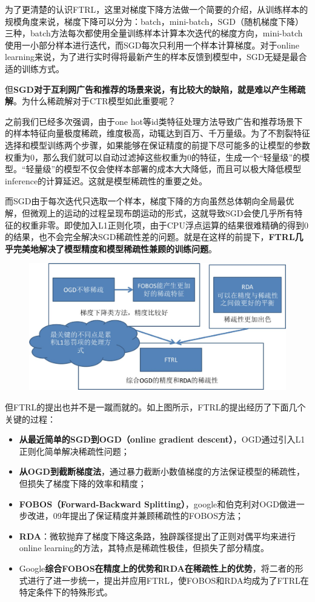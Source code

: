 \documentclass[12pt]{article}
\begin{document}
为了更清楚的认识FTRL，这里对梯度下降方法做一个简要的介绍，从训练样本的规模角度来说，梯度下降可以分为：batch，mini-batch，SGD（随机梯度下降）三种，batch方法每次都使用全量训练样本计算本次迭代的梯度方向，mini-batch使用一小部分样本进行迭代，而SGD每次只利用一个样本计算梯度。对于online learning来说，为了进行实时得将最新产生的样本反馈到模型中，SGD无疑是最合适的训练方式。

但\textbf{SGD对于互利网广告和推荐的场景来说，有比较大的缺陷，就是难以产生稀疏解}。为什么稀疏解对于CTR模型如此重要呢？

之前我们已经多次强调，由于one hot等id类特征处理方法导致广告和推荐场景下的样本特征向量极度稀疏，维度极高，动辄达到百万、千万量级。为了不割裂特征选择和模型训练两个步骤，如果能够在保证精度的前提下尽可能多的让模型的参数权重为0，那么我们就可以自动过滤掉这些权重为0的特征，生成一个“轻量级”的模型。“轻量级”的模型不仅会使样本部署的成本大大降低，而且可以极大降低模型inference的计算延迟。这就是模型稀疏性的重要之处。

而SGD由于每次迭代只选取一个样本，梯度下降的方向虽然总体朝向全局最优解，但微观上的运动的过程呈现布朗运动的形式，这就导致SGD会使几乎所有特征的权重非零。即使加入L1正则化项，由于CPU浮点运算的结果很难精确的得到0的结果，也不会完全解决SGD稀疏性差的问题。就是在这样的前提下，\textbf{FTRL几乎完美地解决了模型精度和模型稀疏性兼顾的训练问题}。
\begin{figure}[H]
    \centering
    \includegraphics[width=1\textwidth]{fig/FTRL_Evolution.jpg}
\end{figure}

但FTRL的提出也并不是一蹴而就的。如上图所示，FTRL的提出经历了下面几个关键的过程：
\begin{itemize}
\setlength{\itemsep}{0pt}
\setlength{\parsep}{0pt}
\setlength{\parskip}{0pt}
    \item \textbf{从最近简单的SGD到OGD（online gradient descent）}，OGD通过引入L1正则化简单解决稀疏性问题；
    \item \textbf{从OGD到截断梯度法}，通过暴力截断小数值梯度的方法保证模型的稀疏性，但损失了梯度下降的效率和精度；
    \item \textbf{FOBOS（Forward-Backward Splitting）}，google和伯克利对OGD做进一步改进，09年提出了保证精度并兼顾稀疏性的FOBOS方法；
    \item \textbf{RDA}：微软抛弃了梯度下降这条路，独辟蹊径提出了正则对偶平均来进行online learning的方法，其特点是稀疏性极佳，但损失了部分精度。
    \item Google\textbf{综合FOBOS在精度上的优势和RDA在稀疏性上的优势}，将二者的形式进行了进一步统一，提出并应用FTRL，使FOBOS和RDA均成为了FTRL在特定条件下的特殊形式。
\end{itemize}
\end{document}
